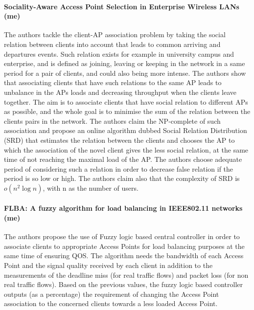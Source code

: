 \documentclass[journal,transmag]{IEEEtran}
\begin{document}
\paragraph{Sociality-Aware Access Point Selection in Enterprise Wireless LANs \cite{13sociality_aware_AP_slection} (me)} 
The authors tackle the client-AP association problem by taking the social relation between clients into account that leads to common arriving and departures events. Such relation exists for example in university campus and enterprise, and is defined as joining, leaving or keeping in the network in a same period for a pair of clients, and could also being more intense. The authors show that associating clients that have such relations to the same AP leads to unbalance in the APs loads and decreasing throughput when the clients leave together. The aim is to associate clients that have social relation to different APs as possible, and the whole goal is to minimise the sum of the relation between the clients pairs in the network. The authors claim the NP-complete of such association and propose an online algorithm dubbed Social Relation Distribution (SRD) that estimates the relation between the clients and chooses the AP to which the association of the novel client gives the less social relation, at the same time of not reaching the maximal load of the AP. The authors choose adequate period of considering such a relation in order to decrease false relation if the period is so low or high. The authors claim also that the complexity of SRD is $o(n^2\log n)$, with n as the number of users. \\ 

\paragraph{FLBA: A fuzzy algorithm for load balancing in IEEE802.11 networks 
\cite{15fuzzy_load_balancing_802.11} (me)}
The authors propose the use of Fuzzy logic based central controller in order to associate clients to appropriate Access Points for load balancing purposes at the same time of ensuring QOS. The algorithm needs the bandwidth of each Access Point and the signal quality received by each client in addition to the measurements of the deadline miss (for real traffic flows) and packet loss (for non real traffic flows). Based on the previous values, the fuzzy logic based controller outputs (as a percentage) the requirement of changing the Access Point association to the concerned clients towards a less loaded Access Point.  \\
\end{document}
